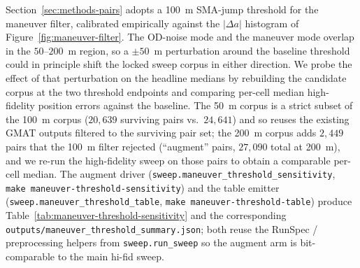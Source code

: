 \documentclass[10pt, letterpaper]{article}
\begin{document}
Section~\ref{sec:methods-pairs} adopts a 100~m SMA-jump threshold for
the maneuver filter, calibrated empirically against the $|\Delta a|$
histogram of Figure~\ref{fig:maneuver-filter}. The OD-noise mode and
the maneuver mode overlap in the $50$--$200$~m region, so a
$\pm 50$~m perturbation around the baseline threshold could in
principle shift the locked sweep corpus in either direction. We
probe the effect of that perturbation on the headline medians by
rebuilding the candidate corpus at the two threshold endpoints and
comparing per-cell median high-fidelity position errors against the
baseline. The 50~m corpus is a strict subset of the 100~m corpus
($20{,}639$ surviving pairs vs.\ $24{,}641$) and so reuses the
existing GMAT outputs filtered to the surviving pair set; the 200~m
corpus adds $2{,}449$ pairs that the 100~m filter rejected
(``augment'' pairs, $27{,}090$ total at 200~m), and we re-run the
high-fidelity sweep on those pairs to obtain a comparable per-cell
median. The augment driver
(\texttt{sweep.maneuver\_threshold\_sensitivity},
\texttt{make maneuver-threshold-sensitivity}) and the table emitter
(\texttt{sweep.maneuver\_threshold\_table},
\texttt{make maneuver-threshold-table}) produce
Table~\ref{tab:maneuver-threshold-sensitivity} and the corresponding
\texttt{outputs/maneuver\_threshold\_summary.json}; both reuse the
RunSpec / preprocessing helpers from \texttt{sweep.run\_sweep} so the
augment arm is bit-comparable to the main hi-fid sweep.

\begin{table}[ht]
  \centering
  \caption{Per-cell median high-fidelity position error
  $|\Delta\mathbf{r}|_{\mathrm{hifi}}$ at the baseline 100~m maneuver
  threshold, with its $95\%$ satellite-level bootstrap confidence
  interval (1{,}000 resamples drawing satellites with replacement and
  pooling all of each drawn satellite's pairs to preserve within-sat
  correlation across $\Delta t$ buckets). The 50~m and 200~m columns
  report the per-cell median expressed as a relative shift versus the
  baseline; values flagged with $\dagger$ sit outside the $95\%$
  bootstrap CI of the corresponding baseline cell.}
  \label{tab:maneuver-threshold-sensitivity}
  
\end{table}
\end{document}
